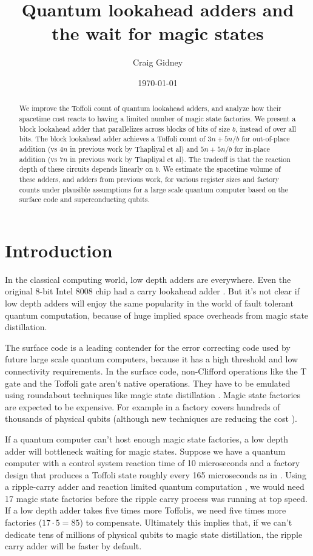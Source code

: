 \documentclass[onecolumn,unpublished]{quantumarticle}
\title{Quantum lookahead adders and the wait for magic states}
\date{\today}
\author{Craig Gidney}
\affiliation{Google Inc., Santa Barbara, California 93117, USA}
\theoremstyle{definition}
\theoremstyle{definition}
\theoremstyle{definition}
\begin{document}
\maketitle

\begin{abstract}
We improve the Toffoli count of quantum lookahead adders, and analyze how their spacetime cost reacts to having a limited number of magic state factories.
We present a block lookahead adder that parallelizes across blocks of bits of size $b$, instead of over all bits.
The block lookahead adder achieves a Toffoli count of $3n + 5n/b$ for out-of-place addition (vs $4n$ in previous work by Thapliyal et al) and $5n + 5n/b$ for in-place addition (vs $7n$ in previous work by Thapliyal et al).
The tradeoff is that the reaction depth of these circuits depends linearly on $b$.
We estimate the spacetime volume of these adders, and adders from previous work, for various register sizes and factory counts under plausible assumptions for a large scale quantum computer based on the surface code and superconducting qubits.
\end{abstract}

\section{Introduction}

In the classical computing world, low depth adders are everywhere.
Even the original 8-bit Intel 8008 chip had a carry lookahead adder \cite{shirriff2020reverseengineer8008}.
But it's not clear if low depth adders will enjoy the same popularity in the world of fault tolerant quantum computation, because of huge implied space overheads from magic state distillation.

The surface code \cite{fowler2012surfacereview} is a leading contender for the error correcting code used by future large scale quantum computers, because it has a high threshold and low connectivity requirements.
In the surface code, non-Clifford operations like the T gate and the Toffoli gate aren't native operations.
They have to be emulated using roundabout techniques like magic state distillation \cite{bravyi2005magicstate}.
Magic state factories are expected to be expensive.
For example in \cite{gidney2019catalyzed} a factory covers hundreds of thousands of physical qubits (although new techniques are reducing the cost \cite{litinski2019magicnotcostly}).

If a quantum computer can't host enough magic state factories, a low depth adder will bottleneck waiting for magic states.
Suppose we have a quantum computer with a control system reaction time of 10 microseconds and a factory design that produces a Toffoli state roughly every 165 microseconds as in \cite{gidney2019autoccz}.
Using a ripple-carry adder and reaction limited quantum computation \cite{fowler2012timeoptimal,gidney2019autoccz}, we would need 17 magic state factories before the ripple carry process was running at top speed.
If a low depth adder takes five times more Toffolis, we need five times more factories ($17 \cdot 5 = 85$) to compensate.
Ultimately this implies that, if we can't dedicate tens of millions of physical qubits to magic state distillation, the ripple carry adder will be faster by default.
\end{document}
